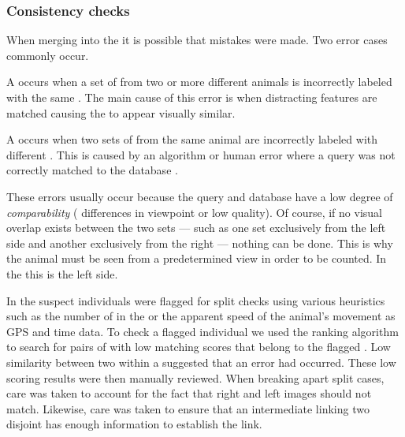         \subsubsection{Consistency checks}
            When merging \encounters{} into the \masterdatabase{} it is possible that mistakes were made.  Two
            error cases commonly occur.
            \begin{enumln}
            \item  A  occurs when a set of \annots{} from two or more different animals is
            incorrectly labeled with the same \name{}.  The main cause of this error is when distracting features are
            matched causing the \annots{} to appear visually similar.
            \item A  occurs when two sets of \annots{} from the same animal are incorrectly
            labeled with different \names{}.  This is caused by an algorithm or human error where a query \encounter{}
            was not correctly matched to the database \exemplars{}.
            \end{enumln}
            These errors usually occur because the query and database \annots{} have a low degree of \emph{comparability} (\eg{}
            differences in viewpoint or low quality).  Of course, if no visual overlap exists between the two sets ---
            such as one set exclusively from the left side and another exclusively from the right --- nothing can be
            done.  This is why the animal must be seen from a predetermined view in order to be counted.  In the \GZC{}
            this is the left side.

            In the \GZC{} suspect individuals were flagged for split checks using various heuristics such as the
            number of \annots{} in the \name{} or the apparent speed of the animal's movement as GPS and time data.
            To check a flagged individual we used the ranking algorithm to search for pairs of \annots{} with low
            matching scores that belong to the flagged \name{}. Low similarity between two \annots{} within a
            \name{} suggested that an error had occurred. These low scoring results were then manually reviewed.
            When breaking apart split cases, care was taken to account for the fact that right and left images
            should not match. Likewise, care was taken to ensure that an intermediate \annot{} linking two disjoint
            \annots{} has enough information to establish the link. 


